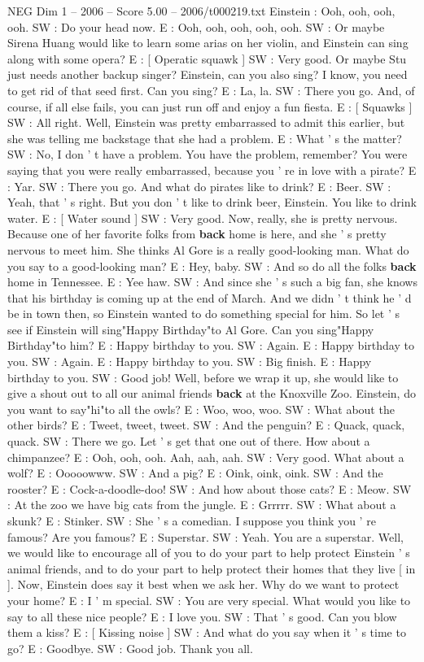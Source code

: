 \begin{textsample}{NEG Dim 1 – 2006 – Score 5.00 – 2006/t000219.txt}
Einstein : Ooh, ooh, ooh, ooh.
SW : Do your head now.
E : Ooh, ooh, ooh, ooh, ooh.
SW : Or maybe Sirena Huang would like to learn some arias on her violin, and Einstein can sing along with some opera?
E : [ Operatic squawk ] SW : Very good.
Or maybe Stu just needs another backup singer?
Einstein, can you also sing?
I know, you need to get rid of that seed first.
Can you sing?
E : La, la.
SW : There you go.
And, of course, if all else fails, you can just run off and enjoy a fun fiesta.
E : [ Squawks ] SW : All right.
Well, Einstein was pretty embarrassed to admit this earlier, but she was telling me backstage that she had a problem.
E : What ' s the matter?
SW : No, I don ' t have a problem.
You have the problem, remember?
You were saying that you were really embarrassed, because you ' re in love with a pirate?
E : Yar.
SW : There you go.
And what do pirates like to drink?
E : Beer.
SW : Yeah, that ' s right.
But you don ' t like to drink beer, Einstein.
You like to drink water.
E : [ Water sound ] SW : Very good.
Now, really, she is pretty nervous.
Because one of her favorite folks from \textbf{back} home is here, and she ' s pretty nervous to meet him.
She thinks Al Gore is a really good-looking man.
What do you say to a good-looking man?
E : Hey, baby.
SW : And so do all the folks \textbf{back} home in Tennessee.
E : Yee haw.
SW : And since she ' s such a big fan, she knows that his birthday is coming up at the end of March.
And we didn ' t think he ' d be in town then, so Einstein wanted to do something special for him.
So let ' s see if Einstein will sing"Happy Birthday"to Al Gore.
Can you sing"Happy Birthday"to him?
E : Happy birthday to you.
SW : Again.
E : Happy birthday to you.
SW : Again.
E : Happy birthday to you.
SW : Big finish.
E : Happy birthday to you.
SW : Good job!
Well, before we wrap it up, she would like to give a shout out to all our animal friends \textbf{back} at the Knoxville Zoo.
Einstein, do you want to say"hi"to all the owls?
E : Woo, woo, woo.
SW : What about the other birds?
E : Tweet, tweet, tweet.
SW : And the penguin?
E : Quack, quack, quack.
SW : There we go.
Let ' s get that one out of there.
How about a chimpanzee?
E : Ooh, ooh, ooh.
Aah, aah, aah.
SW : Very good.
What about a wolf?
E : Ooooowww.
SW : And a pig?
E : Oink, oink, oink.
SW : And the rooster?
E : Cock-a-doodle-doo!
SW : And how about those cats?
E : Meow.
SW : At the zoo we have big cats from the jungle.
E : Grrrrr.
SW : What about a skunk?
E : Stinker.
SW : She ' s a comedian.
I suppose you think you ' re famous?
Are you famous?
E : Superstar.
SW : Yeah.
You are a superstar.
Well, we would like to encourage all of you to do your part to help protect Einstein ' s animal friends, and to do your part to help protect their homes that they live [ in ].
Now, Einstein does say it best when we ask her.
Why do we want to protect your home?
E : I ' m special.
SW : You are very special.
What would you like to say to all these nice people?
E : I love you.
SW : That ' s good.
Can you blow them a kiss?
E : [ Kissing noise ] SW : And what do you say when it ' s time to go?
E : Goodbye.
SW : Good job.
Thank you all.

\end{textsample}
